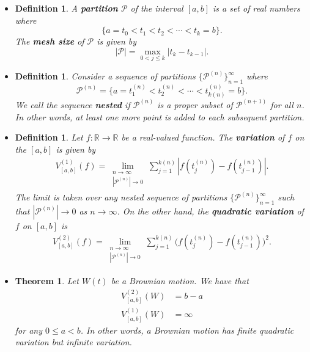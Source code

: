 \documentclass[10pt]{article}
\newtheorem{theorem}[lemma]{Theorem}
\newtheorem{definition}[lemma]{Definition}
\newcommand{\mcal}[1]{\mathcal{#1}}
\newcommand{\Real}{\mathbb{R}}
\begin{document}
\begin{itemize} 
  \item \begin{definition}
    A {\bf partition} $\mcal{P}$ of the interval $[a,b]$ is a set of real numbers where $$\{ a = t_0 < t_1 < t_2 < \dotsb < t_k = b \}.$$ The {\bf mesh size} of $\mcal{P}$ is given by
    $$|\mcal{P}| = \max_{0 < j \leq k} |t_k - t_{k-1}|.$$    
  \end{definition}  

  \item \begin{definition}
    Consider a sequence of partitions $\{ \mcal{P}^{(n)} \}_{n=1}^\infty$ where $$\mcal{P}^{(n)} = \{ a = t_1^{(n)} < t_2^{(n)} < \dotsb < t_{k(n)}^{(n)} = b \}.$$ We call the sequence {\bf nested} if $\mcal{P}^{(n)}$ is a proper subset of $\mcal{P}^{(n+1)}$ for all $n$. In other words, at least one more point is added to each subsequent partition.
  \end{definition}

  \item \begin{definition}
    Let $f: \Real \rightarrow \Real$ be a real-valued function. The {\bf variation} of $f$ on the $[a,b]$ is given by
    \begin{align*}
      V^{(1)}_{[a,b]}(f) = \lim_{\substack{n \rightarrow \infty\\|\mcal{P}^{(n)}| \rightarrow 0}} \sum_{j=1}^{k(n)} |f(t_j^{(n)}) - f(t_{j-1}^{(n)})|.
    \end{align*}
    The limit is taken over any nested sequence of partitions $\{ \mcal{P}^{(n)} \}_{n=1}^\infty$ such that $|\mcal{P}^{(n)}| \rightarrow 0$ as $n \rightarrow \infty$. On the other hand, the {\bf quadratic variation} of $f$ on $[a,b]$ is
    \begin{align*}
      V^{(2)}_{[a,b]}(f) = \lim_{\substack{n \rightarrow \infty\\|\mcal{P}^{(n)}| \rightarrow 0}} \sum_{j=1}^{k(n)} \Big( f(t_j^{(n)}) - f(t_{j-1}^{(n)})\Big)^2.
    \end{align*}    
  \end{definition}

  \item \begin{theorem}
    Let $W(t)$ be a Brownian motion. We have that
    \begin{align*}
      V^{(2)}_{[a,b]}(W) &= b-a \\
      V^{(1)}_{[a,b]}(W) &= \infty
    \end{align*}
    for any $0 \leq a < b$. In other words, a Brownian motion has finite quadratic variation but infinite variation.
  \end{theorem}


\end{itemize}
\end{document}
